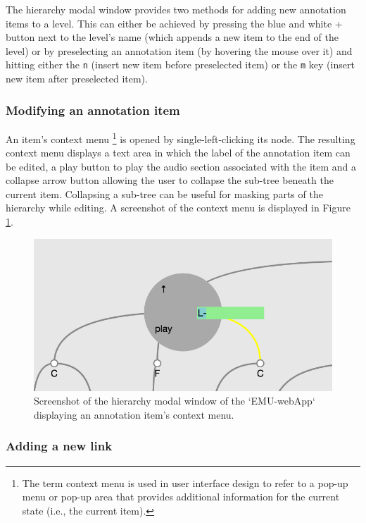 \documentclass[]{book}
\let\rmarkdownfootnote\footnote%
\def\footnote{\protect\rmarkdownfootnote}
\theoremstyle{definition}
\theoremstyle{definition}
\theoremstyle{definition}
\theoremstyle{remark}
\begin{document}
The hierarchy modal window provides two methods for adding new
annotation items to a level. This can either be achieved by pressing the
blue and white + button next to the level's name (which appends a new
item to the end of the level) or by preselecting an annotation item (by
hovering the mouse over it) and hitting either the \texttt{n} (insert
new item before preselected item) or the \texttt{m} key (insert new item
after preselected item).

\hypertarget{modifying-an-annotation-item}{%
\subsubsection{Modifying an annotation
item}\label{modifying-an-annotation-item}}

An item's context menu \footnote{The term context menu is used in user
  interface design to refer to a pop-up menu or pop-up area that
  provides additional information for the current state (i.e., the
  current item).} is opened by single-left-clicking its node. The
resulting context menu displays a text area in which the label of the
annotation item can be edited, a play button to play the audio section
associated with the item and a collapse arrow button allowing the user
to collapse the sub-tree beneath the current item. Collapsing a sub-tree
can be useful for masking parts of the hierarchy while editing. A
screenshot of the context menu is displayed in Figure
\ref{fig:webApp-hierContextMenu}.

\begin{figure}

{\centering \includegraphics[width=0.65\linewidth]{pics/emu-webAppHierContextMenu} 

}

\caption{Screenshot of the hierarchy modal window of the `EMU-webApp` displaying an annotation item's context menu.}\label{fig:webApp-hierContextMenu}
\end{figure}

\hypertarget{adding-a-new-link}{%
\subsubsection{Adding a new link}\label{adding-a-new-link}}
\end{document}
